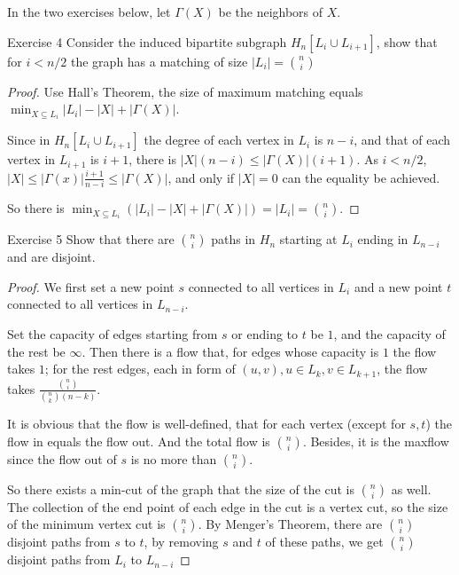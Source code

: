     \newpage

    In the two exercises below, let $\Gamma(X)$ be the neighbors of $X$. 
    \begin{thm}{Exercise 4}{}
        Consider the induced bipartite subgraph $H_n[L_i\cup L_{i+1}]$, show that for $i<n/2$ the graph has a matching of size $|L_i|=\binom{n}{i}$
    \end{thm}
    \begin{proof}
        Use Hall's Theorem, the size of maximum matching equals $\min_{X\subseteq L_i}|L_i|-|X|+|\Gamma(X)|$. 

        Since in $H_n[L_i\cup L_{i+1}]$ the degree of each vertex in $L_i$ is $n-i$, 
        and that of each vertex in $L_{i+1}$ is $i+1$, there is $|X|(n-i)\leq|\Gamma(X)|(i+1)$. 
        As $i<n/2$, $|X|\leq|\Gamma(x)|\frac{i+1}{n-i}\leq|\Gamma(X)|$, and only if $|X|=0$ can the equality be achieved. 

        So there is $\min_{X\subseteq L_i}(|L_i|-|X|+|\Gamma(X)|)=|L_i|=\binom{n}{i}$. 
    \end{proof} 

    \newpage

    \begin{thm}{Exercise 5}{}
        Show that there are $\binom{n}{i}$ paths in $H_n$ starting at $L_i$ ending in $L_{n-i}$ and are disjoint. 
    \end{thm}
    \begin{proof}
        We first set a new point $s$ connected to all vertices in $L_i$ and a new point $t$ connected to all vertices in $L_{n-i}$. 
        
        Set the capacity of edges starting from $s$ or ending to $t$ be $1$, and the capacity of the rest be $\infty$. 
        Then there is a flow that, for edges whose capacity is $1$ the flow takes $1$; for the rest edges, 
        each in form of $(u,v), u\in L_k,v\in L_{k+1}$, the flow takes $\frac{\binom{n}{i}}{\binom{n}{k}(n-k)}$. 

        It is obvious that the flow is well-defined, that for each vertex (except for $s,t$) the flow in equals the flow out. 
        And the total flow is $\binom{n}{i}$. Besides, it is the maxflow since the flow out of $s$ is no more than $\binom{n}{i}$. 

        So there exists a min-cut of the graph that the size of the cut is $\binom{n}{i}$ as well. 
        The collection of the end point of each edge in the cut is a vertex cut, 
        so the size of the minimum vertex cut is $\binom{n}{i}$. 
        By Menger's Theorem, there are $\binom{n}{i}$ disjoint paths from $s$ to $t$, 
        by removing $s$ and $t$ of these paths, we get $\binom{n}{i}$ disjoint paths from $L_i$ to $L_{n-i}$ 
        
    \end{proof} 

